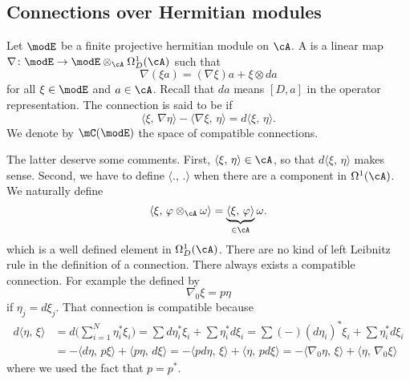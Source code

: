 \subsection{Connections over Hermitian modules}

\begin{definition}
	Let $\modE$ be a finite projective hermitian module on $\cA$. A  is a linear map $\nabla\colon \modE\to \modE\otimes_{\cA}\Omega^1_D(\cA)$ such that
	\begin{equation}
		\nabla(\xi a)=(\nabla\xi)a+\xi\otimes da
	\end{equation}
	for all $\xi\in\modE$ and $a\in\cA$. Recall that $da$ means $[D,a]$ in the operator representation. The connection is said to be  if
	\begin{equation}
		\langle \xi,\,\nabla\eta\rangle-\langle \nabla\xi,\,\eta\rangle=d\langle \xi,\,\eta\rangle.
	\end{equation}
	We denote by $\mC(\modE)$ the space of compatible connections.

\end{definition}
The latter deserve some comments. First, $\langle \xi,\,\eta\rangle\in\cA$, so that $d\langle \xi,\,\eta\rangle$ makes sense. Second, we have to define $\langle .,\,.\rangle$ when there are a component in $\Omega^1(\cA)$. We naturally define
\[
	\langle \xi,\,\varphi\otimes_{\cA}\omega\rangle=\underbrace{\langle \xi,\, \varphi\rangle}_{\in\cA}\omega.
\]
which is a well defined element in $\Omega^1_D(\cA)$. There are no kind of left Leibnitz rule in the definition of a connection. There always exists a compatible connection. For example the  defined by
\begin{equation}
	\nabla_0\xi=p\eta
\end{equation}
if $\eta_j=d\xi_j$. That connection is compatible because
\begin{equation}
	\begin{split}
		d\langle \eta,\,\xi\rangle&=d\big( \sum_{i=1}^{N}\eta_i^*\xi_i \big)=\sum d\eta_i^*\xi_i+\sum \eta_i^*d\xi_i
		=\sum (-)(d\eta_i)^*\xi_i+\sum \eta_i^*d\xi_i\\
		&=-\langle d\eta,\,p\xi\rangle+\langle p\eta,\,d\xi\rangle=-\langle pd\eta,\,\xi\rangle+\langle  \eta,\,pd\xi\rangle
		=-\langle \nabla_0\eta,\,\xi\rangle+\langle \eta,\,\nabla_0\xi\rangle
	\end{split}
\end{equation}
where we used the fact that $p=p^*$.


